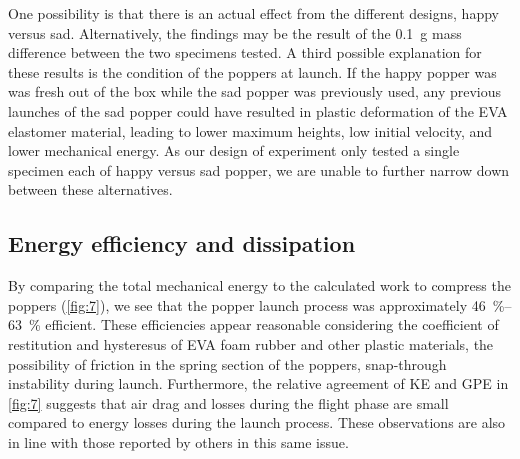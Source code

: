 \documentclass[reprint,amsmath,amssymb,aps,twoside]{revtex4-2} %
\begin{document}
One possibility is that there is an actual effect from the different designs, happy versus sad. Alternatively, the findings may be the result of the \qty{0.1}{\gram} mass difference between the two specimens tested. A third possible explanation for these results is the condition of the poppers at launch. If the happy popper was was fresh out of the box while the sad popper was previously used, any previous launches of the sad popper could have resulted in plastic deformation of the EVA elastomer material, leading to lower maximum heights, low initial velocity, and lower mechanical energy. As our design of experiment only tested a single specimen each of happy versus sad popper, we are unable to further narrow down between these alternatives.

\subsection{Energy efficiency and dissipation}
By comparing the total mechanical energy to the calculated work to compress the poppers (\cref{fig:7}), we see that the popper launch process was approximately \qtyrange{46}{63}{\percent} efficient. These efficiencies appear reasonable considering the coefficient of restitution and hysteresus of EVA foam rubber and other plastic materials, the possibility of friction in the spring section of the poppers, snap-through instability during launch. Furthermore, the relative agreement of KE and GPE in \cref{fig:7} suggests that air drag and losses during the flight phase are small compared to energy losses during the launch process. These observations are also in line with those reported by others in this same issue. 

    
\end{document}
